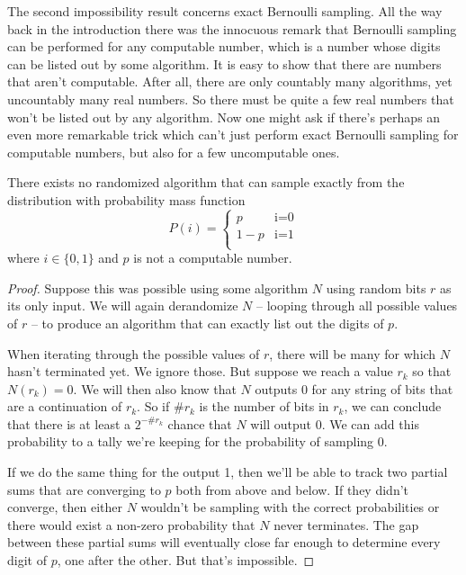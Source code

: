 The second impossibility result concerns exact Bernoulli sampling. All the way back in the introduction there was the innocuous remark that Bernoulli sampling can be performed for any computable number, which is a number whose digits can be listed out by some algorithm. It is easy to show that there are numbers that aren't computable. After all, there are only countably many algorithms, yet uncountably many real numbers. So there must be quite a few real numbers that won't be listed out by any algorithm. Now one might ask if there's perhaps an even more remarkable trick which can't just perform exact Bernoulli sampling for computable numbers, but also for a few uncomputable ones.

\begin{proposition}
	There exists no randomized algorithm that can sample exactly from the distribution with probability mass function
	\[
	P(i)=
	\begin{cases}
	p & \text{i=0}\\
	1-p & \text{i=1}\\

	\end{cases}
	\]
	where $i\in\{0,1\}$ and $p$ is not a computable number.
\end{proposition}
\begin{proof}
Suppose this was possible using some algorithm $N$ using random bits $r$ as its only input. We will again derandomize $N$ -- looping through all possible values of $r$ -- to produce an algorithm that can exactly list out the digits of $p$.

When iterating through the possible values of $r$, there will be many for which $N$ hasn't terminated yet. We ignore those. But suppose we reach a value $r_k$ so that $N(r_k)=0$. We will then also know that $N$ outputs 0 for any string of bits that are a continuation of $r_k$. So if $\#r_k$ is the number of bits in $r_k$, we can conclude that there is at least a $2^{-\#r_k}$ chance that $N$ will output 0. We can add this probability to a tally we're keeping for the probability of sampling 0.

If we do the same thing for the output 1, then we'll be able to track two partial sums that are converging to $p$ both from above and below. If they didn't converge, then either $N$ wouldn't be sampling with the correct probabilities or there would exist a non-zero probability that $N$ never terminates. The gap between these partial sums will eventually close far enough to determine every digit of $p$, one after the other. But that's impossible. \lightning
\end{proof}




